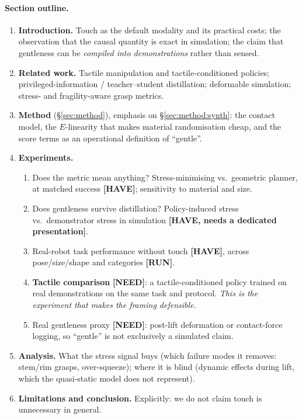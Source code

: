 \paragraph{Section outline.}
\begin{enumerate}
  \item \textbf{Introduction.} Touch as the default modality and its practical costs; the
        observation that the causal quantity is exact in simulation; the claim that
        gentleness can be \emph{compiled into demonstrations} rather than sensed.
  \item \textbf{Related work.} Tactile manipulation and tactile-conditioned policies;
        privileged-information / teacher--student distillation; deformable simulation;
        stress- and fragility-aware grasp metrics.
  \item \textbf{Method} (\S\ref{sec:method}), emphasis on \S\ref{sec:method:synth}: the
        contact model, the $E$-linearity that makes material randomisation cheap, and the
        score terms as an operational definition of ``gentle''.
  \item \textbf{Experiments.}
    \begin{enumerate}\renewcommand{\labelenumii}{\alph{enumii})}
      \item Does the metric mean anything? Stress-minimising vs.\ geometric planner, at
            matched success \textbf{[HAVE]}; sensitivity to material and size.
      \item Does gentleness survive distillation? Policy-induced stress vs.\ demonstrator
            stress in simulation \textbf{[HAVE, needs a dedicated presentation]}.
      \item Real-robot task performance without touch \textbf{[HAVE]}, across pose/size/shape
            and categories \textbf{[RUN]}.
      \item \textbf{Tactile comparison} \textbf{[NEED]}: a tactile-conditioned policy trained
            on real demonstrations on the same task and protocol. \emph{This is the
            experiment that makes the framing defensible.}
      \item Real gentleness proxy \textbf{[NEED]}: post-lift deformation or contact-force
            logging, so ``gentle'' is not exclusively a simulated claim.
    \end{enumerate}
  \item \textbf{Analysis.} What the stress signal buys (which failure modes it removes:
        stem/rim grasps, over-squeeze); where it is blind (dynamic effects during lift,
        which the quasi-static model does not represent).
  \item \textbf{Limitations and conclusion.} Explicitly: we do not claim touch is unnecessary
        in general.
\end{enumerate}

